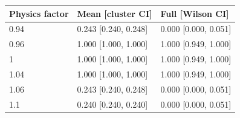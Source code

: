 \begin{tabular}{lll}\toprule
Physics factor & Mean [cluster CI] & Full [Wilson CI]\\ \midrule
0.94 & 0.243 [0.240, 0.248] & 0.000 [0.000, 0.051]\\
0.96 & 1.000 [1.000, 1.000] & 1.000 [0.949, 1.000]\\
1 & 1.000 [1.000, 1.000] & 1.000 [0.949, 1.000]\\
1.04 & 1.000 [1.000, 1.000] & 1.000 [0.949, 1.000]\\
1.06 & 0.243 [0.240, 0.248] & 0.000 [0.000, 0.051]\\
1.1 & 0.240 [0.240, 0.240] & 0.000 [0.000, 0.051]\\
\bottomrule\end{tabular}
